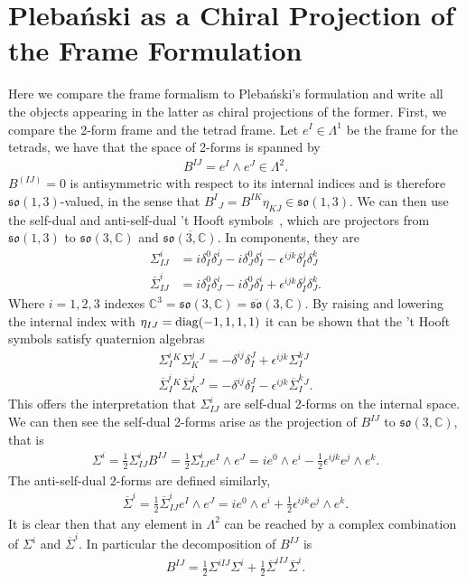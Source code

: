 \documentclass[10pt]{report}
\newcommand{\pleb}[0]{Pleba\'nski}
\theoremstyle{definition}
\newcommand{\C}[0]{\mathbb{C}}
\newcommand{\soC}{\mathfrak{so}{(3,\C)}}
\newcommand{\asd}[0]{\overline{\Sigma}}
\begin{document}
\section{\pleb{} as a Chiral Projection of the Frame Formulation}
Here we compare the frame formalism to \pleb{}'s formulation and write all the objects appearing in the latter as chiral projections of the former. First, we compare the 2-form frame and the tetrad frame. Let $e^I \in \Lambda^1$ be the frame for the tetrads, we have that the space of 2-forms is spanned by 
\begin{align}
    B^{IJ} = e^I \wedge e^J \in \Lambda^2.
\end{align}
$B^{(IJ)} = 0$ is antisymmetric with respect to its internal indices and is therefore $\mathfrak{so}(1,3)$-valued, in the sense that $B^I{}_J = B^{IK} \eta_{KJ} \in \mathfrak{so}(1,3)$. We can then use the self-dual and anti-self-dual 't Hooft symbols~\cite{Computation_of_t_Hoo_1976}, which are projectors from $\mathfrak{so}(1,3)$  to $\mathfrak{so}(3,\C)$ and $\overline{\mathfrak{so}(3,\C)}$. In components, they are
\begin{align}
    \Sigma^i_{IJ} & = i \delta^0_I \delta^i_J - i \delta^0_J \delta^i_I - \epsilon^{ijk} 
    \delta^j_I \delta^k_J \\
    \asd^i_{IJ} & = i \delta^0_I \delta^i_J - i \delta^0_J \delta^i_I + \epsilon^{ijk} \delta^j_I \delta^k_J.
\end{align}
Where $i = 1,2,3$ indexes $\C^3 = \mathfrak{so}(3,\C) = \overline{\mathfrak{so}}(3,\C)$. By raising and lowering the internal index with $\eta_{IJ} = {\rm diag}(-1,1,1,1)$ it can be shown that the 't Hooft symbols satisfy quaternion algebras 
\begin{align}
    \Sigma^i_I{}^K \Sigma^j_K{}^J = -\delta^{ij} \delta_I^J + \epsilon^{ijk} \Sigma^k_I{}^J \label{eq:pleb-internal-self-dual-2-form-quaterion-algebra} \\
    \asd^i_I{}^K \asd^j_K{}^J = -\delta^{ij} \delta_I^J - \epsilon^{ijk} \asd^k_I{}^J.
\end{align}
This offers the interpretation that $\Sigma^i_{IJ}$ are self-dual 2-forms on the internal space. We can then see the self-dual 2-forms arise as the projection of $B^{IJ}$ to $\soC$, that is 
\begin{align}
    \Sigma^i = \frac{1}{2} \Sigma^i_{IJ} B^{IJ} = \frac{1}{2} \Sigma^i_{IJ} e^I \wedge e^J = i e^0 \wedge e^i - \frac{1}{2} \epsilon^{ijk} e^j \wedge e^k. \label{eq:pleb-self-dual-2-forms-from-chiral-tetrad}
\end{align}
The anti-self-dual 2-forms are defined similarly,
\begin{align}
    \asd^i = \frac{1}{2} \asd^i_{IJ} e^I \wedge e^J = i e^0 \wedge e^i + \frac{1}{2} \epsilon^{ijk} e^j \wedge e^k. \label{eq:pleb-anti-self-dual-2-forms-from-chiral-tetrad}
\end{align}
It is clear then that any element in $\Lambda^2$ can be reached by a complex combination of $\Sigma^i$ and $\asd^i$. In particular the decomposition of $B^{IJ}$ is
\begin{align}
    B^{IJ} = \frac{1}{2} \Sigma^{iIJ} \Sigma^i + \frac{1}{2} \asd^{iIJ} \asd^i.
\end{align}
\end{document}
